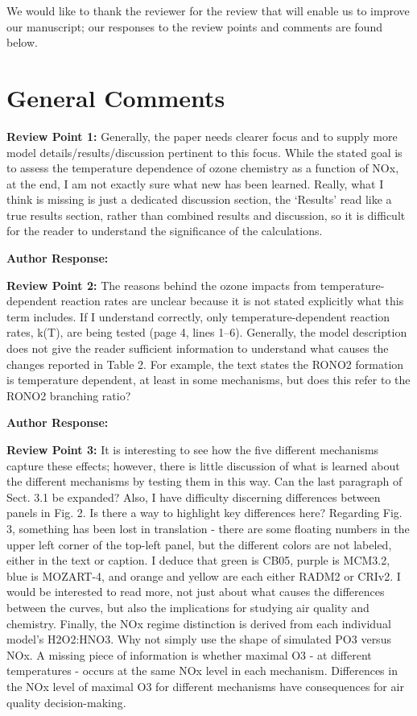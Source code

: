 \documentclass{article}
\begin{document}
We would like to thank the reviewer for the review that will enable us to improve our manuscript; our responses to the review points and comments are found below.

\section*{General Comments}

\textbf{Review Point 1:}  Generally, the paper needs clearer focus and to supply more model details/results/discussion pertinent to this focus. While the stated goal is to assess the temperature dependence of ozone chemistry as a function of NOx, at the end, I am not exactly sure what new has been learned. Really, what I think is missing is just a dedicated discussion section, the `Results' read like a true results section, rather than combined results and discussion, so it is difficult for the reader to understand the significance of the calculations.

\textbf{Author Response:} 

\textbf{Review Point 2:} The reasons behind the ozone impacts from temperature-dependent reaction rates are unclear because it is not stated explicitly what this term includes. If I understand correctly, only temperature-dependent reaction rates, k(T), are being tested (page 4, lines 1–6). Generally, the model description does not give the reader sufficient information to understand what causes the changes reported in Table 2. For example, the text states the RONO2 formation is temperature dependent, at least in some mechanisms, but does this refer to the RONO2 branching ratio?

\textbf{Author Response:}

\textbf{Review Point 3:} It is interesting to see how the five different mechanisms capture these effects; however, there is little discussion of what is learned about the different mechanisms by testing them in this way. Can the last paragraph of Sect. 3.1 be expanded? Also, I have difficulty discerning differences between panels in Fig. 2. Is there a way to highlight key differences here? Regarding Fig. 3, something has been lost in translation - there are some floating numbers in the upper left corner of the top-left panel, but the different colors are not labeled, either in the text or caption. I deduce that green is CB05, purple is MCM3.2, blue is MOZART-4, and orange and yellow are each either RADM2 or CRIv2. I would be interested to read more, not just about what causes the differences between the curves, but also the implications for studying air quality and chemistry. Finally, the NOx regime distinction is derived from each individual model's H2O2:HNO3. Why not simply use the shape of simulated PO3 versus NOx. A missing piece of information is whether maximal O3 - at different temperatures - occurs at the same NOx level in each mechanism. Differences in the NOx level of maximal O3 for different mechanisms have consequences for air quality decision-making.
\end{document}
